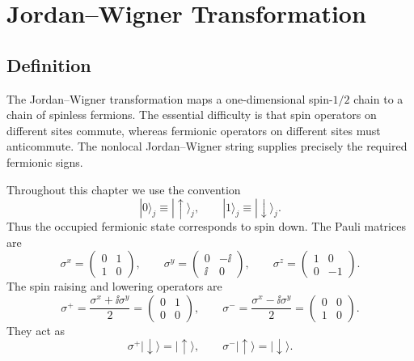 \chapter{Jordan--Wigner Transformation}

\section{Definition}

The Jordan--Wigner transformation maps a one-dimensional spin-$1/2$ chain to a
chain of spinless fermions. The essential difficulty is that spin operators on
different sites commute, whereas fermionic operators on different sites must
anticommute. The nonlocal Jordan--Wigner string supplies precisely the required
fermionic signs.

Throughout this chapter we use the convention
\begin{equation}
    |0\rangle_j \equiv |\uparrow\rangle_j,
    \qquad
    |1\rangle_j \equiv |\downarrow\rangle_j .
\end{equation}
Thus the occupied fermionic state corresponds to spin down. The Pauli matrices are
\begin{equation}
    \sigma^x =
    \begin{pmatrix}
        0 & 1\\
        1 & 0
    \end{pmatrix},
    \qquad
    \sigma^y =
    \begin{pmatrix}
        0 & -\ii\\
        \ii & 0
    \end{pmatrix},
    \qquad
    \sigma^z =
    \begin{pmatrix}
        1 & 0\\
        0 & -1
    \end{pmatrix}.
\end{equation}
The spin raising and lowering operators are
\begin{equation}
    \sigma^+
    =
    \frac{\sigma^x+\ii\sigma^y}{2}
    =
    \begin{pmatrix}
        0 & 1\\
        0 & 0
    \end{pmatrix},
    \qquad
    \sigma^-
    =
    \frac{\sigma^x-\ii\sigma^y}{2}
    =
    \begin{pmatrix}
        0 & 0\\
        1 & 0
    \end{pmatrix}.
\end{equation}
They act as
\begin{equation}
    \sigma^+|\downarrow\rangle = |\uparrow\rangle,
    \qquad
    \sigma^-|\uparrow\rangle = |\downarrow\rangle .
\end{equation}

